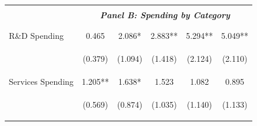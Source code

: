 \documentclass[dv_diss_main.tex]{subfiles}
\begin{document}
\begin{table}[H]
\begin{center}
{\begin{tabular}{lccccc}
    \cmidrule{2-6}
    \vspace{-1.5pt} & \vspace{-1.5pt} & \vspace{-1.5pt} & \vspace{-1.5pt} & \vspace{-1.5pt} \\
    & \multicolumn{5}{c}{\textit{\textbf{Panel B: Spending by Category}}} \\ 
    \vspace{-1.5pt} & \vspace{-1.5pt} & \vspace{-1.5pt} & \vspace{-1.5pt} & \vspace{-1.5pt} \\ 
    \cmidrule{2-6}
    \vspace{-1.5pt} & \vspace{-1.5pt} & \vspace{-1.5pt} & \vspace{-1.5pt} & \vspace{-1.5pt} \\
    R\&D Spending & 0.465 & 2.086* & 2.883** & 5.294** & 5.049** \\
    \vspace{4pt} & \begin{footnotesize}(0.379)\end{footnotesize} & \begin{footnotesize}(1.094)\end{footnotesize} & \begin{footnotesize}(1.418)\end{footnotesize} & \begin{footnotesize}(2.124)\end{footnotesize} & \begin{footnotesize}(2.110)\end{footnotesize} \\
    Services Spending & 1.205** & 1.638* & 1.523 & 1.082 & 0.895 \\
    \vspace{4pt} & \begin{footnotesize}(0.569)\end{footnotesize} & \begin{footnotesize}(0.874)\end{footnotesize} & \begin{footnotesize}(1.035)\end{footnotesize} & \begin{footnotesize}(1.140)\end{footnotesize} & \begin{footnotesize}(1.133)\end{footnotesize} \\

\end{tabular}}
\end{center}
\end{table}
\end{document}
